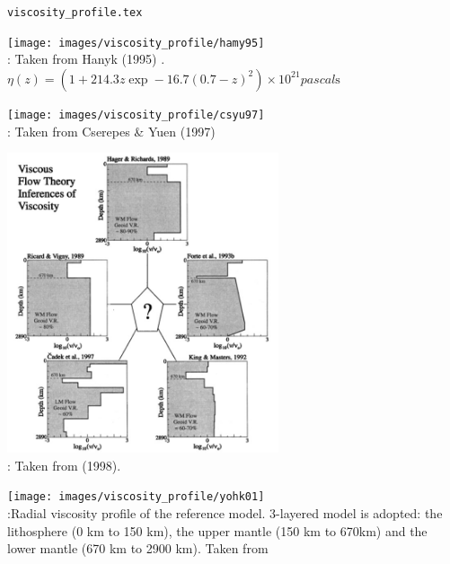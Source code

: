 \begin{flushright} {\tiny {\color{gray} \tt viscosity\_profile.tex}} \end{flushright}


\begin{center}
\texttt{[image: images/viscosity\_profile/hamy95]}\\
{\captionfont \nineteenninetyfive: Taken from Hanyk \etal (1995) \cite{hamy95}. 
$\eta(z)=(1+214.3z\exp-16.7(0.7-z)^2)\times 10^{21}\si{pascal\second}$ }
\end{center}

\begin{center}
\texttt{[image: images/viscosity\_profile/csyu97]}\\
{\captionfont \nineteenninetyseven: Taken from Cserepes \& Yuen (1997) \cite{csyu97}} 
\end{center}

\begin{center}
\includegraphics[width=8cm]{images/viscosity_profile/pape98}\\
{\captionfont \nineteenninetyeight: Taken from \textcite{pape98} (1998).} 
\end{center}

\begin{center}
\texttt{[image: images/viscosity\_profile/yohk01]}\\
{\captionfont \twothousandone:Radial viscosity profile of the reference model. 3-layered model is adopted: 
the lithosphere (0 km to 150 km), the upper mantle (150 km to 670km) 
and the lower mantle (670 km to 2900 km). Taken from \cite{yohk01}}
\end{center}


